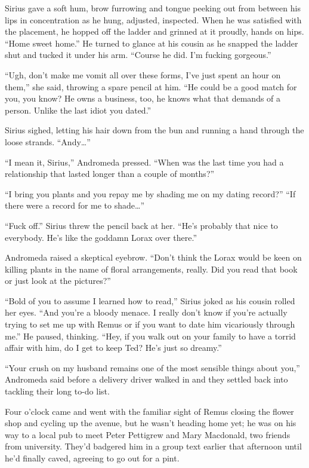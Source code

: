 Sirius gave a soft hum, brow furrowing and tongue peeking out from between his lips in concentration as he hung, adjusted, inspected. When he was satisfied with the placement, he hopped off the ladder and grinned at it proudly, hands on hips. “Home sweet home.” He turned to glance at his cousin as he snapped the ladder shut and tucked it under his arm. “Course he did. I’m fucking gorgeous.”

“Ugh, don’t make me vomit all over these forms, I’ve just spent an hour on them,” she said, throwing a spare pencil at him. “He could be a good match for you, you know? He owns a business, too, he knows what that demands of a person. Unlike the last idiot you dated.”

Sirius sighed, letting his hair down from the bun and running a hand through the loose strands. “Andy…”

“I mean it, Sirius,” Andromeda pressed. “When was the last time you had a relationship that lasted longer than a couple of months?”

“I bring you plants and you repay me by shading me on my dating record?”
“If there were a record for me to shade…”

“Fuck off.” Sirius threw the pencil back at her. “He’s probably that nice to everybody. He’s like the goddamn Lorax over there.”

Andromeda raised a skeptical eyebrow. “Don’t think the Lorax would be keen on killing plants in the name of floral arrangements, really. Did you read that book or just look at the pictures?”

“Bold of you to assume I learned how to read,” Sirius joked as his cousin rolled her eyes. “And you’re a bloody menace. I really don’t know if you’re actually trying to set me up with Remus or if you want to date him vicariously through me.” He paused, thinking. “Hey, if you walk out on your family to have a torrid affair with him, do I get to keep Ted? He’s just so dreamy.”

“Your crush on my husband remains one of the most sensible things about you,” Andromeda said before a delivery driver walked in and they settled back into tackling their long to-do list.

Four o’clock came and went with the familiar sight of Remus closing the flower shop and cycling up the avenue, but he wasn’t heading home yet; he was on his way to a local pub to meet Peter Pettigrew and Mary Macdonald, two friends from university. They’d badgered him in a group text earlier that afternoon until he’d finally caved, agreeing to go out for a pint.

